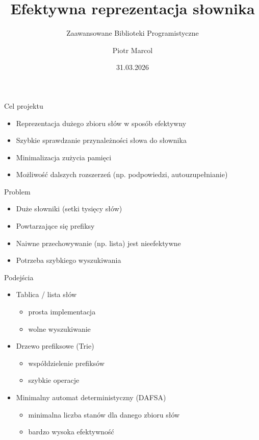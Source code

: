\documentclass{beamer}
\title{Efektywna reprezentacja słownika}
\subtitle{Zaawansowane Biblioteki Programistyczne}
\author{Piotr Marcol}
\date{31.03.2026}
\begin{document}
\frame{\titlepage}


\begin{frame}{Cel projektu}
    \begin{itemize}
        \item Reprezentacja dużego zbioru słów w sposób efektywny
        \item Szybkie sprawdzanie przynależności słowa do słownika
        \item Minimalizacja zużycia pamięci
        \item Możliwość dalszych rozszerzeń (np. podpowiedzi, autouzupełnianie)
    \end{itemize}
\end{frame}


\begin{frame}{Problem}
    \begin{itemize}
        \item Duże słowniki (setki tysięcy słów)
        \item Powtarzające się prefiksy
        \item Naiwne przechowywanie (np. lista) jest nieefektywne
        \item Potrzeba szybkiego wyszukiwania
    \end{itemize}
\end{frame}


\begin{frame}{Podejścia}
    \begin{itemize}
        \item Tablica / lista słów
              \begin{itemize}
                  \item prosta implementacja
                  \item wolne wyszukiwanie
              \end{itemize}

        \item Drzewo prefiksowe (Trie)
              \begin{itemize}
                  \item współdzielenie prefiksów
                  \item szybkie operacje
              \end{itemize}

        \item Minimalny automat deterministyczny (DAFSA)
              \begin{itemize}
                  \item minimalna liczba stanów dla danego zbioru słów
                  \item bardzo wysoka efektywność
              \end{itemize}
    \end{itemize}
\end{frame}
\end{document}
